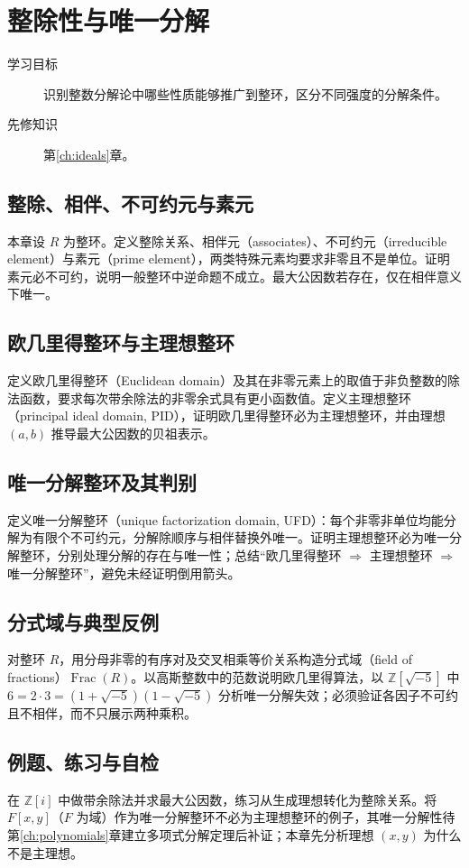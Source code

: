 \setcounter{chapter}{11} %
\chapter{整除性与唯一分解}\label{ch:factorization}

\begin{description}
  \item[学习目标] 识别整数分解论中哪些性质能够推广到整环，区分不同强度的分解条件。
  \item[先修知识] 第\ref{ch:ideals}章。
\end{description}

\section{整除、相伴、不可约元与素元}
本章设 $R$ 为整环。定义整除关系、相伴元（associates）、不可约元（irreducible element）与素元（prime element），两类特殊元素均要求非零且不是单位。证明素元必不可约，说明一般整环中逆命题不成立。最大公因数若存在，仅在相伴意义下唯一。

\section{欧几里得整环与主理想整环}
定义欧几里得整环（Euclidean domain）及其在非零元素上的取值于非负整数的除法函数，要求每次带余除法的非零余式具有更小函数值。定义主理想整环（principal ideal domain, PID），证明欧几里得整环必为主理想整环，并由理想 $(a,b)$ 推导最大公因数的贝祖表示。

\section{唯一分解整环及其判别}
定义唯一分解整环（unique factorization domain, UFD）：每个非零非单位均能分解为有限个不可约元，分解除顺序与相伴替换外唯一。证明主理想整环必为唯一分解整环，分别处理分解的存在与唯一性；总结“欧几里得整环 $\Rightarrow$ 主理想整环 $\Rightarrow$ 唯一分解整环”，避免未经证明倒用箭头。

\section{分式域与典型反例}
对整环 $R$，用分母非零的有序对及交叉相乘等价关系构造分式域（field of fractions）$\operatorname{Frac}(R)$。以高斯整数中的范数说明欧几里得算法，以 $\mathbb Z[\sqrt{-5}]$ 中 $6=2\cdot3=(1+\sqrt{-5})(1-\sqrt{-5})$ 分析唯一分解失效；必须验证各因子不可约且不相伴，而不只展示两种乘积。

\section{例题、练习与自检}
在 $\mathbb Z[i]$ 中做带余除法并求最大公因数，练习从生成理想转化为整除关系。将 $F[x,y]$（$F$ 为域）作为唯一分解整环不必为主理想整环的例子，其唯一分解性待第\ref{ch:polynomials}章建立多项式分解定理后补证；本章先分析理想 $(x,y)$ 为什么不是主理想。

